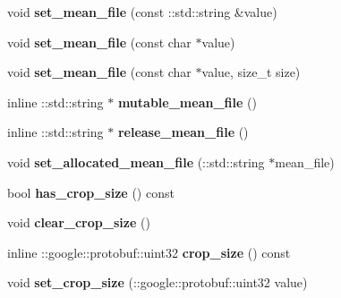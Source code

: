 \begin{DoxyCompactItemize}
void {\bfseries set\+\_\+mean\+\_\+file} (const \+::std\+::string \&value)
\item 
\mbox{\label{classcaffe_1_1_image_data_parameter_a800112efaa6170ea143515dda01847f2}} 
void {\bfseries set\+\_\+mean\+\_\+file} (const char $\ast$value)
\item 
\mbox{\label{classcaffe_1_1_image_data_parameter_ad61d4e02ae0a705655e414346d84e6dd}} 
void {\bfseries set\+\_\+mean\+\_\+file} (const char $\ast$value, size\+\_\+t size)
\item 
\mbox{\label{classcaffe_1_1_image_data_parameter_a16293ccc46ab38abbb647fcc33857c7f}} 
inline \+::std\+::string $\ast$ {\bfseries mutable\+\_\+mean\+\_\+file} ()
\item 
\mbox{\label{classcaffe_1_1_image_data_parameter_a2e293f952efa957959c300ff78f1c2ca}} 
inline \+::std\+::string $\ast$ {\bfseries release\+\_\+mean\+\_\+file} ()
\item 
\mbox{\label{classcaffe_1_1_image_data_parameter_a7822695da657574950f40da000ac70cd}} 
void {\bfseries set\+\_\+allocated\+\_\+mean\+\_\+file} (\+::std\+::string $\ast$mean\+\_\+file)
\item 
\mbox{\label{classcaffe_1_1_image_data_parameter_add8c6a3c059a2af953602a9401203caa}} 
bool {\bfseries has\+\_\+crop\+\_\+size} () const
\item 
\mbox{\label{classcaffe_1_1_image_data_parameter_ac0df1d51154cf8a29d56e094dc9187eb}} 
void {\bfseries clear\+\_\+crop\+\_\+size} ()
\item 
\mbox{\label{classcaffe_1_1_image_data_parameter_aa62f3e29b26ebef3fb19e06dc8b8334d}} 
inline \+::google\+::protobuf\+::uint32 {\bfseries crop\+\_\+size} () const
\item 
\mbox{\label{classcaffe_1_1_image_data_parameter_a4ea0ccc44aa5c0f9fcf71f8169cb2be8}} 
void {\bfseries set\+\_\+crop\+\_\+size} (\+::google\+::protobuf\+::uint32 value)

\end{DoxyCompactItemize}
